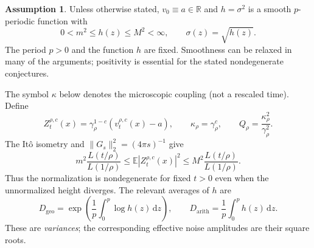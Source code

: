 \documentclass[11pt]{article}
\numberwithin{equation}{section}
\theoremstyle{definition}
\newtheorem{assumption}[theorem]{Assumption}
\theoremstyle{remark}
\newcommand{\R}{\mathbb R}
\newcommand{\E}{\mathbb E}
\newcommand{\dd}{\,\mathrm d}
\newcommand{\Geo}{D_{\mathrm{geo}}}
\newcommand{\Arith}{D_{\mathrm{arith}}}
\begin{document}
\begin{assumption}\label{ass:main}
Unless otherwise stated, $v_0\equiv a\in\R$ and $h=\sigma^2$ is a smooth $p$-periodic function with
\[
 0<m^2\le h(z)\le M^2<\infty,\qquad \sigma(z)=\sqrt{h(z)}.
\]
The period $p>0$ and the function $h$ are fixed. Smoothness can be relaxed in many of the arguments; positivity is essential for the stated nondegenerate conjectures.
\end{assumption}
The symbol $\kappa$ below denotes the microscopic coupling (not a rescaled time). Define
\begin{equation}\label{eq:norm}
 Z_t^{\rho,c}(x)=\gamma_\rho^{1-c}(v_t^{\rho,c}(x)-a),\qquad
 \kappa_\rho=\gamma_\rho^c,
 \qquad Q_\rho=\frac{\kappa_\rho^2}{\gamma_\rho^2}.
\end{equation}
The It\^o isometry and $\|G_s\|_2^2=(4\pi s)^{-1}$ give
\begin{equation}\label{eq:variance_rho}
 m^2\frac{L(t/\rho)}{L(1/\rho)}\le \E|Z_t^{\rho,c}(x)|^2
 \le M^2\frac{L(t/\rho)}{L(1/\rho)}.
\end{equation}
Thus the normalization is nondegenerate for fixed $t>0$ even when the unnormalized height diverges. The relevant averages of $h$ are
\[
 \Geo=\exp\!\left(\frac1p\int_0^p\log h(z)\dd z\right),\qquad
 \Arith=\frac1p\int_0^p h(z)\dd z.
\]
These are \emph{variances}; the corresponding effective noise amplitudes are their square roots.
\end{document}
